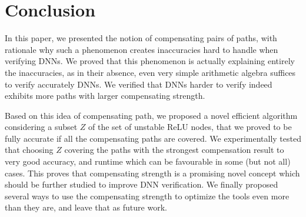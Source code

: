 \documentclass{llncs}
\begin{document}
\section{Conclusion}

In this paper, we presented the notion of compensating pairs of paths, with rationale why such a phenomenon creates inaccuracies hard to handle when verifying DNNs. We proved that this phenomenon is actually explaining entirely the inaccuracies, as in their absence, even very simple arithmetic algebra suffices to verify accurately DNNs. We verified that DNNs harder to verify indeed exhibits more paths with larger compensating strength. 

Based on this idea of compensating path, we proposed a novel efficient algorithm considering a subset $Z$ of the set of unstable ReLU nodes, that we proved to be fully accurate if all the compensating paths are covered. We experimentally tested that choosing $Z$ covering the paths with the strongest compensation result to very good accuracy, and runtime which can be favourable in some (but not all) cases. 
This proves that compensating strength is a promising novel concept which should be further studied to 
improve DNN verification. We finally proposed several ways to use the compensating strength to optimize the tools even more than they are, and leave that as future work.

\newpage




\newpage

\appendix


\end{document}
